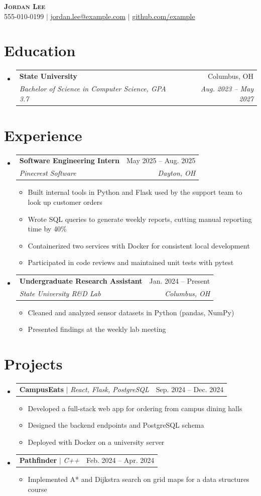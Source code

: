 \documentclass[letterpaper,11pt]{article}
\makeatletter
\newcommand{\resumeItem}[1]{
  \item\small{
    {#1 \vspace{-2pt}}
  }
}
\newcommand{\resumeSubheading}[4]{
  \vspace{-2pt}\item
    \begin{tabular*}{0.97\textwidth}[t]{l@{\extracolsep{\fill}}r}
      \textbf{#1} & #2 \\
      \textit{\small#3} & \textit{\small #4} \\
    \end{tabular*}\vspace{-7pt}
}
\newcommand{\resumeProjectHeading}[2]{
    \item
    \begin{tabular*}{0.97\textwidth}{l@{\extracolsep{\fill}}r}
      \small#1 & #2 \\
    \end{tabular*}\vspace{-7pt}
}
\newcommand{\resumeSubHeadingListStart}{\begin{itemize}[leftmargin=0.15in, label={}]}
\newcommand{\resumeSubHeadingListEnd}{\end{itemize}}
\newcommand{\resumeItemListStart}{\begin{itemize}}
\newcommand{\resumeItemListEnd}{\end{itemize}\vspace{-5pt}}
\makeatother
\begin{document}
\begin{center}
    \textbf{\Huge \scshape Jordan Lee} \\ \vspace{1pt}
    \small 555-010-0199 $|$ \href{mailto:jordan.lee@example.com}{\underline{jordan.lee@example.com}} $|$
    \href{https://github.com/example}{\underline{github.com/example}}
\end{center}

\section{Education}
  \resumeSubHeadingListStart
    \resumeSubheading
      {State University}{Columbus, OH}
      {Bachelor of Science in Computer Science, GPA 3.7}{Aug. 2023 -- May 2027}
  \resumeSubHeadingListEnd

\section{Experience}
  \resumeSubHeadingListStart

    \resumeSubheading
      {Software Engineering Intern}{May 2025 -- Aug. 2025}
      {Pinecrest Software}{Dayton, OH}
      \resumeItemListStart
        \resumeItem{Built internal tools in Python and Flask used by the support team to look up customer orders}
        \resumeItem{Wrote SQL queries to generate weekly reports, cutting manual reporting time by 40\%}
        \resumeItem{Containerized two services with Docker for consistent local development}
        \resumeItem{Participated in code reviews and maintained unit tests with pytest}
      \resumeItemListEnd

    \resumeSubheading
      {Undergraduate Research Assistant}{Jan. 2024 -- Present}
      {State University R\&D Lab}{Columbus, OH}
      \resumeItemListStart
        \resumeItem{Cleaned and analyzed sensor datasets in Python (pandas, NumPy)}
        \resumeItem{Presented findings at the weekly lab meeting}
      \resumeItemListEnd

  \resumeSubHeadingListEnd

\section{Projects}
    \resumeSubHeadingListStart
      \resumeProjectHeading
          {\textbf{CampusEats} $|$ \emph{React, Flask, PostgreSQL}}{Sep. 2024 -- Dec. 2024}
          \resumeItemListStart
            \resumeItem{Developed a full-stack web app for ordering from campus dining halls}
            \resumeItem{Designed the backend endpoints and PostgreSQL schema}
            \resumeItem{Deployed with Docker on a university server}
          \resumeItemListEnd
      \resumeProjectHeading
          {\textbf{Pathfinder} $|$ \emph{C++}}{Feb. 2024 -- Apr. 2024}
          \resumeItemListStart
            \resumeItem{Implemented A* and Dijkstra search on grid maps for a data structures course}
          \resumeItemListEnd
    \resumeSubHeadingListEnd
\end{document}

